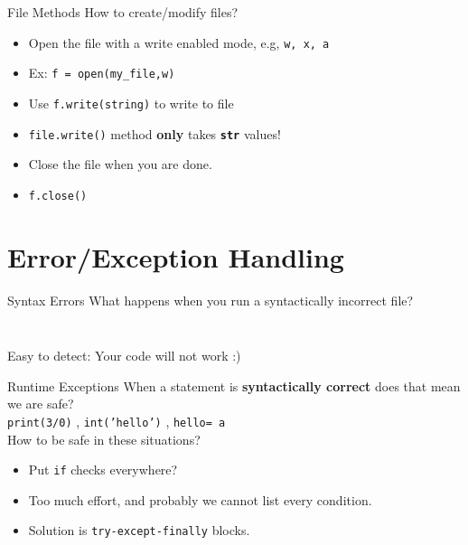     \begin{frame}{File Methods}
        \LARGE
        How to create/modify files?
        \begin{itemize}
            \item Open the file with a write enabled mode, e.g, \texttt{w, x, a}
            \item Ex: \texttt{f = open(\textquotesingle my\_file\textquotesingle ,\textquotesingle w\textquotesingle )}
            \item Use \texttt{f.write(string)} to write to file
            \item \texttt{file.write()} method \textbf{only} takes \texttt{\textbf{str}} values!
            \item Close the file when you are done.
            \item \texttt{f.close()}
        \end{itemize}
    \end{frame}

    \section{Error/Exception Handling}
        \begin{frame}{Syntax Errors}
            \LARGE
            What happens when you run a syntactically incorrect file?
            \inputminted[frame=single,framesep=2pt,firstline=1,lastline=3]{python3}{../Lecture6/code_examples/syntax_error.py}
            \inputminted[frame=single,framesep=2pt,firstline=5]{python3}{../Lecture6/code_examples/syntax_error.py}
            Easy to detect: Your code will not work :)
        \end{frame}

    \begin{frame}{Runtime Exceptions}
        \LARGE
        When a statement is \textbf{syntactically correct} does that mean we are safe?\\
        \texttt{print(3/0)}
        , \texttt{int('hello')}
        , \texttt{\textquotesingle hello\textquotesingle [2] = \textquotesingle a\textquotesingle }\\
        How to be safe in these situations?
        \begin{itemize}
            \item Put \texttt{if} checks everywhere?
            \item Too much effort, and probably we cannot list every condition.
            \item Solution is \texttt{try-except-finally} blocks.
        \end{itemize}
    \end{frame}

